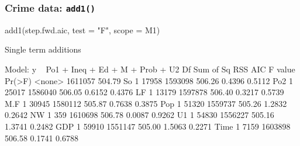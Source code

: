 \documentclass[a4paper]{article}
\begin{document}
\subsubsection{Crime data: \lstinline|add1()|}
\begin{Schunk}
\begin{Sinput}
add1(step.fwd.aic, test = "F", scope = M1)
\end{Sinput}
\begin{Soutput}
Single term additions

Model:
y ~ Po1 + Ineq + Ed + M + Prob + U2
       Df Sum of Sq     RSS    AIC F value Pr(>F)
<none>              1611057 504.79               
So      1     17958 1593098 506.26  0.4396 0.5112
Po2     1     25017 1586040 506.05  0.6152 0.4376
LF      1     13179 1597878 506.40  0.3217 0.5739
M.F     1     30945 1580112 505.87  0.7638 0.3875
Pop     1     51320 1559737 505.26  1.2832 0.2642
NW      1       359 1610698 506.78  0.0087 0.9262
U1      1     54830 1556227 505.16  1.3741 0.2482
GDP     1     59910 1551147 505.00  1.5063 0.2271
Time    1      7159 1603898 506.58  0.1741 0.6788
\end{Soutput}
\end{Schunk}
\end{document}
